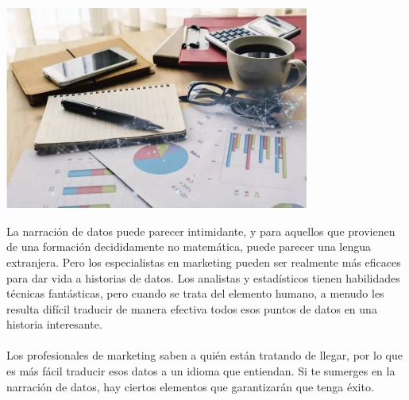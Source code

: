 \documentclass[preprint,12pt]{elsarticle}
\begin{document}
	\begin{center}
		\includegraphics[width=10cm]{./Imagenes/img3} 
	\end{center}

	La narración de datos puede parecer intimidante, y para aquellos que provienen de una formación decididamente no matemática, puede parecer una lengua extranjera. Pero los especialistas en marketing pueden ser realmente más eficaces para dar vida a historias de datos.
	Los analistas y estadísticos tienen habilidades técnicas fantásticas, pero cuando se trata del elemento humano, a menudo les resulta difícil traducir de manera efectiva todos esos puntos de datos en una historia interesante.\\
	\\
	Los profesionales de marketing saben a quién están tratando de llegar, por lo que es más fácil traducir esos datos a un idioma que entiendan. Si te sumerges en la narración de datos, hay ciertos elementos que garantizarán que tenga éxito.
	
\end{document}

